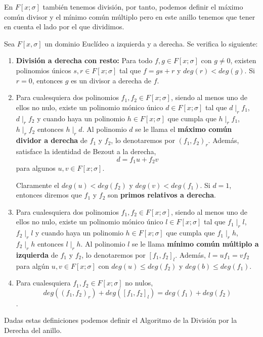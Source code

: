 En $F[x;\sigma]$ también tenemos división, por tanto, podemos definir el máximo común divisor y el mínimo común múltiplo pero en este anillo tenemos que tener en cuenta el lado por el que dividimos.

\begin{theorem}
Sea $F[x,\sigma]$ un dominio Euclídeo a izquierda y a derecha. Se verifica lo siguiente:
\begin{enumerate}
	\item \textbf{División a derecha con resto:} Para todo $f,g \in F[x;\sigma]$ con $g \neq 0$, existen polinomios únicos $s,r \in F[x;\sigma]$ tal que $f = gs + r$ y $deg(r) < deg(g)$. Si $r=0$, entonces $g$ es un divisor a derecha de $f$.
	
	\item Para cualesquiera dos polinomios $f_1,f_2 \in F[x;\sigma]$, siendo al menos uno de ellos no nulo, existe un polinomio mónico único $d \in F[x;\sigma]$ tal que $d \mid_r f_1$, $d \mid_r f_2$ y cuando haya un polinomio $ h \in F[x;\sigma]$ que cumpla que $h \mid_r f_1$, $h \mid_r f_2$ entonces $h \mid_r d$. Al polinomio $d$ se le llama el \textbf{máximo común dividor a derecha} de $f_1$ y $f_2$, lo denotaremos por $(f_1,f_2)_r$. Además, satisface la identidad de Bezout a la derecha,
	\[ d = f_1 u + f_2 v \] para algunos $u,v \in F[x;\sigma]$.
	
Claramente el $deg(u) < deg(f_2)$ y $deg(v) < deg(f_1)$. Si $d=1$, entonces diremos que $f_1$ y $f_2$ son \textbf{primos relativos a derecha}.
	\item Para cualesquiera dos polinomios $f_1,f_2 \in F[x;\sigma]$, siendo al menos uno de ellos no nulo, existe un polinomio mónico único $l \in F[x;\sigma]$ tal que $f_1 \mid_r l$, $f_2 \mid_r l$ y cuando haya un polinomio $ h \in F[x;\sigma]$ que cumpla que $f_1 \mid_r h$, $f_2 \mid_r h$ entonces $l \mid_r h$. Al polinomio $l$ se le llama \textbf{mínimo común múltiplo a izquierda} de $f_1$ y $f_2$, lo denotaremos por $[f_1,f_2]_l$. Además, $l = uf_1 = vf_2$ para algún $u,v \in F[x;\sigma]$ con $deg(u) \leq deg(f_2)$ y $deg(b) \leq deg(f_1)$.

     \item  Para cualesquiera $f_1,f_2 \in F[x;\sigma]$ no nulos, \[ deg((f_1,f_2)_r) + deg([f_1,f_2]_l) = deg(f_1) + deg(f_2)\].
\end{enumerate}
\end{theorem}

Dadas estas definiciones podemos definir el Algoritmo de la División por la Derecha del anillo.

